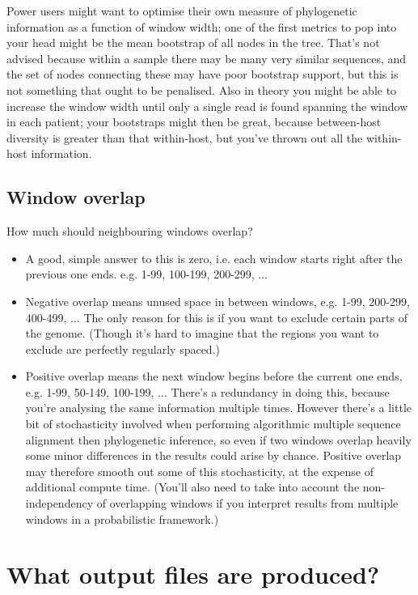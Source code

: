 Power users might want to optimise their own measure of phylogenetic information as a function of window width; one of the first metrics to pop into your head might be the mean bootstrap of all nodes in the tree.
That's not advised because within a sample there may be many very similar sequences, and the set of nodes connecting these may have poor bootstrap support, but this is not something that ought to be penalised.
Also in theory you might be able to increase the window width until only a single read is found spanning the window in each patient; your bootstraps might then be great, because between-host diversity is greater than that within-host, but you've thrown out all the within-host information.


\subsection{Window overlap} \label{sec:overlap}
How much should neighbouring windows overlap?
\begin{itemize}
\item A good, simple answer to this is zero, i.e. each window starts right after the previous one ends.
e.g. 1-99, 100-199, 200-299, $\ldots$
\item Negative overlap means unused space in between windows, e.g. 1-99, 200-299, 400-499, $\ldots$
The only reason for this is if you want to exclude certain parts of the genome.
(Though it's hard to imagine that the regions you want to exclude are perfectly regularly spaced.)
\item Positive overlap means the next window begins before the current one ends, e.g. 1-99, 50-149, 100-199, $\ldots$
There's a redundancy in doing this, because you're analysing the same information multiple times.
However there's a little bit of stochasticity involved when performing algorithmic multiple sequence alignment then phylogenetic inference, so even if two windows overlap heavily some minor differences in the results could arise by chance.
Positive overlap may therefore smooth out some of this stochasticity, at the expense of additional compute time.
(You'll also need to take into account the non-independency of overlapping windows if you interpret results from multiple windows in a probabilistic framework.)
 
 \end{itemize}

\section{What output files are produced?}

